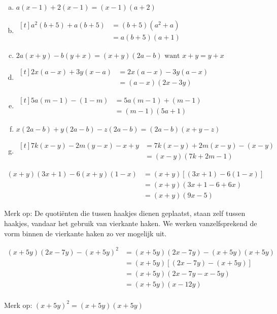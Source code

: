 \documentclass[12pt]{article}
\begin{document}
\begin{solution}
\vspace{-2\topsep}
\begin{enumerate}[(a)]
  \item $a (x - 1) + 2 (x - 1)=(x - 1) (a + 2)$
  \item $\begin{aligned}[t]a^2 (b + 5) + a (b + 5)
  &=(b + 5) (a^2 + a)\\
  &=a (b + 5) (a + 1)\end{aligned}$
  \item $2a (x + y) - b (y + x)=(x + y) (2a - b) \mbox{ want } x + y = y + x$
  \item $\begin{aligned}[t]2x (a - x) + 3y (x - a)
  &=2x (a - x) - 3y (a - x)\\
  &=(a - x) (2x - 3y)\end{aligned}$
  \item $\begin{aligned}[t]5a (m - 1) - (1 - m)
  &=5a (m - 1) + (m - 1)\\
  &=(m - 1) (5a + 1)\end{aligned}$
  \item $x (2a - b) + y (2a - b) - z (2a - b)=(2a - b) (x + y - z)$
  \item $\begin{aligned}[t]7k (x - y) - 2m (y - x) - x + y
  &=7k (x - y) + 2m (x - y) - (x - y)\\
  &= (x - y) (7 k + 2 m - 1)\end{aligned}$
\end{enumerate}
\end{solution}

\begin{voorbeeld}
\begin{align*}
(x + y) (3x + 1) - 6 (x + y) (1 - x)
& = (x + y) [(3x + 1) - 6 (1 - x)]\\
&= (x + y) (3x + 1 - 6 + 6x)\\
&= (x + y) (9x - 5)
\end{align*}

Merk op: De quotiënten die tussen haakjes dienen geplaatst, staan zelf tussen haakjes, vandaar het gebruik van vierkante haken. We werken vanzelfsprekend de vorm binnen de vierkante haken zo ver mogelijk uit.
\end{voorbeeld}

\begin{voorbeeld}
\begin{align*}
(x + 5y) (2x - 7y) - (x + 5y)^2
&= (x + 5y) (2x - 7y) - (x + 5y) (x + 5y)\\
&= (x + 5y) [(2x - 7y) - (x + 5y)]\\
&= (x + 5y) (2x - 7y - x - 5y)\\
&= (x + 5y) (x - 12y)\\
\end{align*}

Merk op: $(x + 5y)^2 = (x + 5y) (x + 5y)$
\end{voorbeeld}
\end{document}
